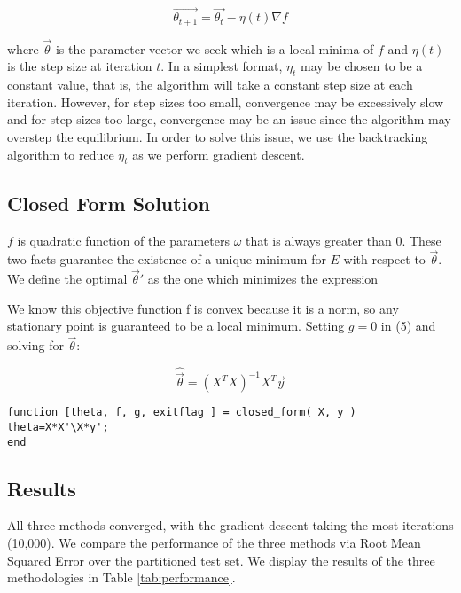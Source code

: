 \documentclass[12pt,oneside]{article}
\begin{document}
\begin{flushleft}
\begin{equation}\label{eqn: grad_desc}
\vec{\theta_{t+1}} = \vec{\theta_t} - \eta(t) \nabla f
\end{equation}\newline

\noindent where $\vec{\theta}$ is the parameter vector we seek which is a local minima of $f$ and $\eta(t)$ is the step size at iteration $t$.  In a simplest format, $\eta_t$ may be chosen to be a constant value, that is, the algorithm will take a constant step size at each iteration.  However, for step sizes too small, convergence may be excessively slow and for step sizes too large, convergence may be an issue since the algorithm may overstep the equilibrium.  In order to solve this issue, we use the backtracking algorithm to reduce $\eta_t$ as we perform gradient descent.  


\subsection*{Closed Form Solution}

$f$ is quadratic function of the parameters $\omega$ that is always greater than $0$. These two facts guarantee the existence of a unique minimum for $E$ with respect to $\vec{\theta}$. We define the optimal $\vec{\theta}'$ as the one which minimizes the expression

We know this objective function f is convex because it is a norm, so any stationary point is guaranteed to be a local minimum. Setting $g=0$ in (5) and solving for $\vec{\theta}$: 

\begin{equation}
\hat{\vec{\theta}}=(X^T X)^{-1}X^T\vec{y}
\end{equation}

\begin{verbatim}
function [theta, f, g, exitflag ] = closed_form( X, y )
theta=X*X'\X*y';
end
\end{verbatim}

\subsection*{Results}
All three methods converged, with the gradient descent taking the most iterations (10,000). We compare the performance of the three methods via Root Mean Squared Error over the partitioned test set.  We display the results of the three methodologies in Table \ref{tab:performance}.


\end{flushleft}
\end{document}
